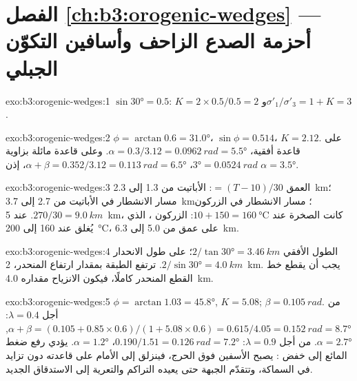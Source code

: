 \section*{الفصل \ref{ch:b3:orogenic-wedges} --- أحزمة الصدع الزاحف وأسافين التكوّن الجبلي}

\begin{solution}{exo:b3:orogenic-wedges:1}
$\sin\ang{30} = 0.5$: $K = 2\times0.5/0.5 = 2$ و$\sigma'_1/\sigma'_3 = 1 +
K = 3$.
\end{solution}

\begin{solution}{exo:b3:orogenic-wedges:2}
$\phi = \arctan0.6 = \ang{31.0}$، $\sin\phi = 0.514$، $K = 2.12$. على
قاعدة أفقية، $\alpha = 0.3/3.12 = \qty{0.0962}{rad} = \ang{5.5}$. وعلى
قاعدة مائلة بزاوية $\ang{3} = \qty{0.0524}{rad}$، $\alpha + \beta = 0.352/3.12 =
\qty{0.113}{rad} = \ang{6.5}$، إذن $\alpha = \ang{3.5}$.
\end{solution}

\begin{solution}{exo:b3:orogenic-wedges:3}
العمق $= (T - 10)/30$: الأباتيت  من 1.3 إلى \qty{2.3}{km}؛ مسار الانشطار في الأباتيت
من 2.7 إلى \qty{3.7}{km}؛ مسار الانشطار في الزركون $270/30 = \qty{9.0}{km}$. عند
\qty{5}{km}، كانت الصخرة عند $10 + 150 = \qty{160}{\celsius}$: الزركون
، الذي يُغلق عند 160 إلى \qty{200}{\celsius}، على عمق
من 5.0 إلى \qty{6.3}{km}.
\end{solution}

\begin{solution}{exo:b3:orogenic-wedges:4}
الطول الأفقي $2/\tan\ang{30} = \qty{3.46}{km}$؛ على طول الانحدار
$2/\sin\ang{30} = \qty{4.0}{km}$. ترتفع الطبقة بمقدار ارتفاع المنحدر،
\qty{2}{km}. يجب أن يقطع خط القطع المنحدر كاملًا، فيكون الانزياح
مقداره \qty{4.0}{km}.
\end{solution}

\begin{solution}{exo:b3:orogenic-wedges:5}
$\phi = \arctan1.03 = \ang{45.8}$, $K = 5.08$; $\beta = \qty{0.105}{rad}$.
من أجل $\lambda = 0.4$: $\alpha + \beta = (0.105 + 0.85\times0.6)/(1 +
5.08\times0.6) = 0.615/4.05 = \qty{0.152}{rad} = \ang{8.7}$, $\alpha =
\ang{2.7}$. من أجل $\lambda = 0.9$: $0.190/1.51 = \qty{0.126}{rad} = \ang{7.2}$،
$\alpha = \ang{1.2}$. يؤدي رفع ضغط المائع إلى خفض :
يصبح الأسفين فوق الحرج، فينزلق إلى الأمام على قاعدته دون
تزايد في السماكة، وتتقدّم الجبهة حتى يعيده التراكم والتعرية
إلى الاستدقاق الجديد.
\end{solution}

